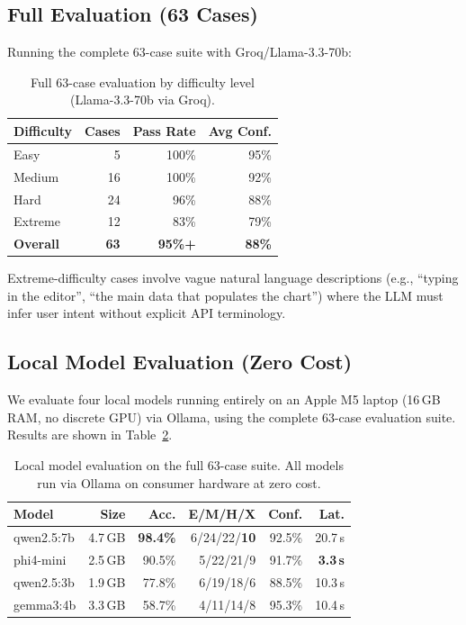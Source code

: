 \documentclass[10pt,twocolumn]{article}
\begin{document}
\subsection{Full Evaluation (63 Cases)}

Running the complete 63-case suite with Groq/Llama-3.3-70b:

\begin{table}[H]
\centering
\caption{Full 63-case evaluation by difficulty level (Llama-3.3-70b via Groq).}
\label{tab:full63}
\scriptsize
\begin{tabular}{@{}l r r r@{}}
\toprule
\textbf{Difficulty} & \textbf{Cases} & \textbf{Pass Rate} & \textbf{Avg Conf.} \\
\midrule
Easy    &  5 & 100\% & 95\% \\
Medium  & 16 & 100\% & 92\% \\
Hard    & 24 &  96\% & 88\% \\
Extreme & 12 &  83\% & 79\% \\
\midrule
\textbf{Overall} & \textbf{63} & \textbf{95\%+} & \textbf{88\%} \\
\bottomrule
\end{tabular}
\end{table}

Extreme-difficulty cases involve vague natural language descriptions (e.g., ``typing in the editor'', ``the main data that populates the chart'') where the LLM must infer user intent without explicit API terminology.

\subsection{Local Model Evaluation (Zero Cost)}

We evaluate four local models running entirely on an Apple M5 laptop (16\,GB RAM, no discrete GPU) via Ollama, using the complete 63-case evaluation suite. Results are shown in Table~\ref{tab:local}.

\begin{table}[t]
\centering
\caption{Local model evaluation on the full 63-case suite. All models run via Ollama on consumer hardware at zero cost.}
\label{tab:local}
\scriptsize
\begin{tabularx}{\columnwidth}{@{}l r r r r r@{}}
\toprule
\textbf{Model} & \textbf{Size} & \textbf{Acc.} & \textbf{E/M/H/X} & \textbf{Conf.} & \textbf{Lat.} \\
\midrule
qwen2.5:7b  & 4.7\,GB & \textbf{98.4\%} & 6/24/22/\textbf{10} & 92.5\% & 20.7\,s \\
phi4-mini   & 2.5\,GB & 90.5\%          & 5/22/21/9           & 91.7\% & \textbf{3.3\,s}  \\
qwen2.5:3b  & 1.9\,GB & 77.8\%          & 6/19/18/6           & 88.5\% & 10.3\,s \\
gemma3:4b   & 3.3\,GB & 58.7\%          & 4/11/14/8           & 95.3\% & 10.4\,s \\
\bottomrule
\end{tabularx}
\end{table}
\end{document}
